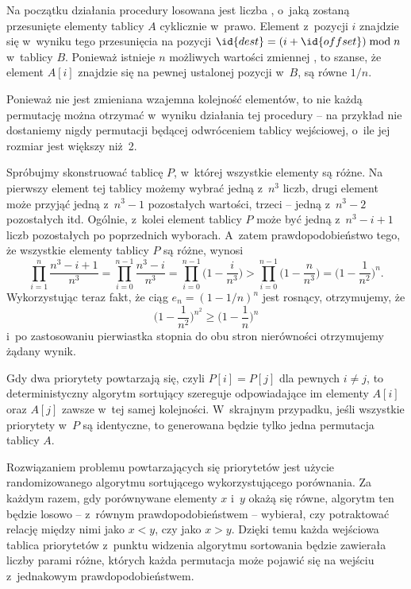 \exercise %
Na początku działania procedury losowana jest liczba , o~jaką zostaną przesunięte elementy tablicy $A$ cyklicznie w~prawo. Element z~pozycji $i$ znajdzie się w~wyniku tego przesunięcia na pozycji $\id{dest}=(i+\id{offset})\bmod n$ w~tablicy $B$. Ponieważ istnieje $n$ możliwych wartości zmiennej , to szanse, że element $A[i]$ znajdzie się na pewnej ustalonej pozycji w~$B$, są równe $1/n$.

Ponieważ nie jest zmieniana wzajemna kolejność elementów, to nie każdą permutację można otrzymać w~wyniku działania tej procedury -- na przykład nie dostaniemy nigdy permutacji będącej odwróceniem tablicy wejściowej, o~ile jej rozmiar jest większy niż~2.

\exercise %
Spróbujmy skonstruować tablicę $P$, w~której wszystkie elementy są różne. Na pierwszy element tej tablicy możemy wybrać jedną z~$n^3$ liczb, drugi element może przyjąć jedną z~$n^3-1$ pozostałych wartości, trzeci -- jedną z~$n^3-2$ pozostałych itd. Ogólnie,  z~kolei element tablicy $P$ może być jedną z~$n^3-i+1$ liczb pozostałych po poprzednich wyborach. A~zatem prawdopodobieństwo tego, że wszystkie elementy tablicy $P$ są różne, wynosi
\[
	\prod_{i=1}^n\frac{n^3-i+1}{n^3} = \prod_{i=0}^{n-1}\frac{n^3-i}{n^3} = \prod_{i=0}^{n-1}\biggl(1-\frac{i}{n^3}\biggr) > \prod_{i=0}^{n-1}\biggl(1-\frac{n}{n^3}\biggr) = \biggl(1-\frac{1}{n^2}\biggr)^n.
\]
Wykorzystując teraz fakt, że ciąg $e_n={(1-1/n)}^n$ jest rosnący, otrzymujemy, że
\[
	\biggl(1-\frac{1}{n^2}\biggr)^{n^2} \ge \biggl(1-\frac{1}{n}\biggr)^n
\]
i~po zastosowaniu pierwiastka  stopnia do obu stron nierówności otrzymujemy żądany wynik.

\exercise %
Gdy dwa priorytety powtarzają się, czyli $P[i]=P[j]$ dla pewnych $i\ne j$, to deterministyczny algorytm sortujący szereguje odpowiadające im elementy $A[i]$ oraz $A[j]$ zawsze w~tej samej kolejności. W~skrajnym przypadku, jeśli wszystkie priorytety w~$P$ są identyczne, to generowana będzie tylko jedna permutacja tablicy $A$.

Rozwiązaniem problemu powtarzających się priorytetów jest użycie randomizowanego algorytmu sortującego wykorzystującego porównania. Za każdym razem, gdy porównywane elementy $x$ i~$y$ okażą się równe, algorytm ten będzie losowo -- z~równym prawdopodobieństwem -- wybierał, czy potraktować relację między nimi jako $x<y$, czy jako $x>y$. Dzięki temu każda wejściowa tablica priorytetów z~punktu widzenia algorytmu sortowania będzie zawierała liczby parami różne, których każda permutacja może pojawić się na wejściu z~jednakowym prawdopodobieństwem.

